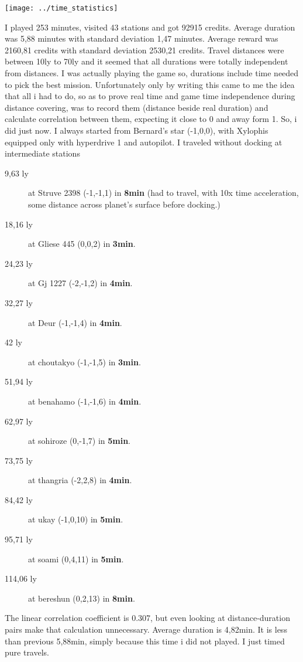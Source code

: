 \documentclass[]{article}
\begin{document}
\begin{center}
	\texttt{[image: ../time\_statistics]}
\end{center}
I played 253 minutes, visited 43 stations and got 92915 credits. Average duration was 5,88 minutes with standard deviation 1,47 minutes. Average reward was 2160,81 credits with standard deviation 2530,21 credits. Travel distances were between 10ly to 70ly and it seemed that all durations were totally independent from distances. I was actually playing the game so, durations include time needed to pick the best mission. Unfortunately only by writing this came to me the idea that all i had to do, so as to prove real time and game time independence during distance covering, was to record them (distance beside real duration) and calculate  correlation between them, expecting it close to 0 and away form 1. So, i did just now. I always started from Bernard's star (-1,0,0), with Xylophis equipped only with hyperdrive 1 and autopilot. I traveled without docking at intermediate stations
\begin{description}
	\item[9,63 ly] at Struve 2398 (-1,-1,1) in\textbf{ 8min} (had to travel, with 10x time acceleration, some distance across planet's surface before docking.) 
	\item[18,16 ly] at Gliese 445 (0,0,2) in\textbf{ 3min}.
	\item[24,23 ly] at Gj 1227 (-2,-1,2) in \textbf{4min}.
	\item[32,27 ly] at Deur (-1,-1,4) in \textbf{4min}.
	\item[42 ly] at  choutakyo (-1,-1,5) in \textbf{3min}.
	\item[51,94 ly] at benahamo (-1,-1,6) in \textbf{4min}.
	\item[62,97 ly] at sohiroze (0,-1,7) in \textbf{5min}.
	\item[73,75 ly] at thangria (-2,2,8) in \textbf{4min}.
	\item[84,42 ly] at ukay (-1,0,10) in \textbf{5min}.
	\item[95,71 ly] at soami (0,4,11) in \textbf{5min}.
	\item[114,06 ly] at bereshun (0,2,13) in \textbf{8min}.
\end{description}
The linear correlation coefficient is 0.307, but  even looking at distance-duration pairs make that calculation unnecessary. Average duration is 4,82min. It is less than previous 5,88min, simply because this time i did not played. I just timed pure travels.
\end{document}
